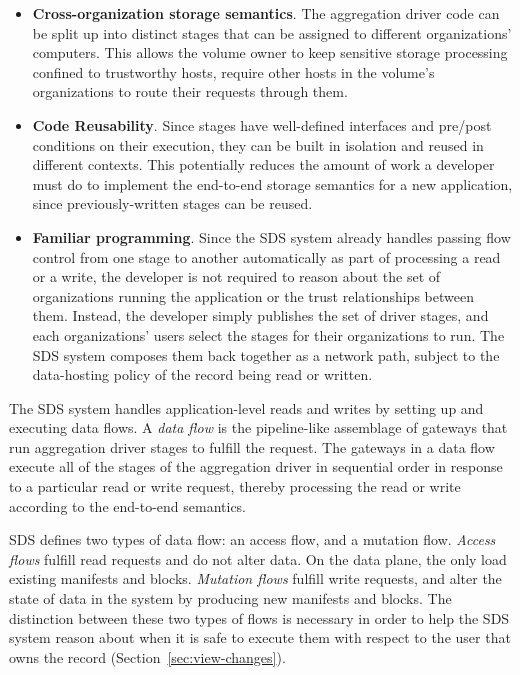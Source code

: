 \begin{itemize}
   \item \textbf{Cross-organization storage semantics}.  The aggregation driver code
      can be split up into distinct stages that can be
      assigned to different organizations' computers.  This allows the volume
      owner to keep sensitive storage processing confined to trustworthy hosts,
      require other hosts in the volume's organizations to route their requests
      through them.
   \item \textbf{Code Reusability}.  Since stages have well-defined interfaces
      and pre/post conditions on their execution,
      they can be built in isolation and reused in different contexts.  This
      potentially reduces the amount of work a developer must do to implement
      the end-to-end storage semantics for a new application, since
      previously-written stages can be reused.
   \item \textbf{Familiar programming}.  Since the SDS system already handles passing
      flow control from one stage to another automatically as part of processing
      a read or a write, the developer is not required to reason about the set
      of organizations running the application or the trust relationships
      between them.  Instead, the developer simply publishes the set of driver
      stages, and each organizations' users select the stages for their
      organizations to run.  The SDS system composes them back together as a
      network path, subject to the data-hosting policy of the record being read
      or written.
\end{itemize}

The SDS system handles application-level reads and writes by setting up and
executing data flows.  A \emph{data flow} is the pipeline-like assemblage of gateways
that run aggregation driver stages to fulfill the request.  The gateways in a data flow execute all
of the stages of the aggregation driver in sequential order in response to a
particular read or write request, thereby processing the
read or write according to the end-to-end semantics.

SDS defines two types of data flow:  an access flow, and a mutation flow.
\emph{Access flows} fulfill read requests and do not alter data.  On the data
plane, the only load existing manifests and blocks.
\emph{Mutation flows} fulfill write requests, and alter
the state of data in the system by producing new manifests and blocks.
The distinction between these two types of flows is necessary in order to help
the SDS system reason about when it is safe to execute them with respect to the
user that owns the record (Section~\ref{sec:view-changes}).

